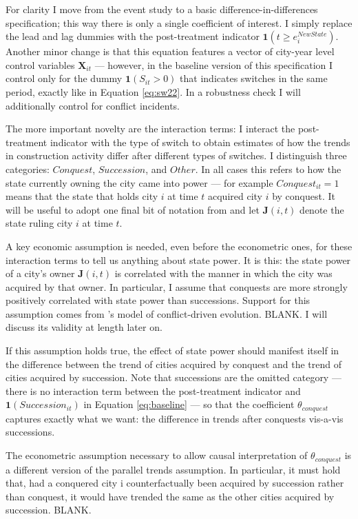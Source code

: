 \documentclass[11pt, a4paper]{article}
\begin{document}
For clarity I move from the event study to a basic difference-in-differences specification; this way there is only a single coefficient of interest. I simply replace the lead and lag dummies with the post-treatment indicator $\mathbf{1}(t \ge e^{NewState}_i)$. Another minor change is that this equation features a vector of city-year level control variables $\mathbf{X}_{it}$ --- however, in the baseline version of this specification I control only for the dummy $\mathbf{1}(S_{it} > 0)$ that indicates switches in the same period, exactly like in Equation \eqref{eq:sw22}. In a robustness check I will additionally control for conflict incidents.

The more important novelty are the interaction terms: I interact the post-treatment indicator with the type of switch to obtain estimates of how the trends in construction activity differ after different types of switches. I distinguish three categories: $Conquest$, $Succession$, and $Other$. In all cases this refers to how the state currently owning the city came into power --- for example $Conquest_{it} = 1$ means that the state that holds city $i$ at time $t$ acquired city $i$ by conquest. It will be useful to adopt one final bit of notation from \cite{schoenholzer2022} and let $\mathbf{J}(i, t)$ denote the state ruling city $i$ at time $t$.

A key economic assumption is needed, even before the econometric ones, for these interaction terms to tell us anything about state power. It is this: the state power of a city's owner $\mathbf{J}(i, t)$ is correlated with the manner in which the city was acquired by that owner. In particular, I assume that conquests are more strongly positively correlated with state power than successions. Support for this assumption comes from \cite{levine2021}'s model of conflict-driven evolution. BLANK. I will discuss its validity at length later on.

If this assumption holds true, the effect of state power should manifest itself in the difference between the trend of cities acquired by conquest and the trend of cities acquired by succession. Note that successions are the omitted category --- there is no interaction term between the post-treatment indicator and $\mathbf{1}(Succession_{it})$ in Equation \eqref{eq:baseline} --- so that the coefficient $\theta_{conquest}$ captures exactly what we want: the difference in trends after conquests vis-a-vis successions.

The econometric assumption necessary to allow causal interpretation of $\theta_{conquest}$ is a different version of the parallel trends assumption. In particular, it must hold that, had a conquered city i counterfactually been acquired by succession rather than conquest, it would have trended the same as the other cities acquired by succession. BLANK.
\end{document}
